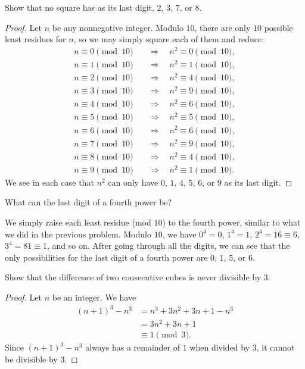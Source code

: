  Show that no square has as its last digit, $2$, $3$, $7$,
or $8$.
\begin{proof}
  Let $n$ be any nonnegative integer. Modulo $10$, there are only $10$
  possible least residues for $n$, so we may simply square each of
  them and reduce:
  \begin{align*}
    n\equiv0\pmod{10}\quad&\Rightarrow\quad n^2\equiv0\pmod{10}, \\
    n\equiv1\pmod{10}\quad&\Rightarrow\quad n^2\equiv1\pmod{10}, \\
    n\equiv2\pmod{10}\quad&\Rightarrow\quad n^2\equiv4\pmod{10}, \\
    n\equiv3\pmod{10}\quad&\Rightarrow\quad n^2\equiv9\pmod{10}, \\
    n\equiv4\pmod{10}\quad&\Rightarrow\quad n^2\equiv6\pmod{10}, \\
    n\equiv5\pmod{10}\quad&\Rightarrow\quad n^2\equiv5\pmod{10}, \\
    n\equiv6\pmod{10}\quad&\Rightarrow\quad n^2\equiv6\pmod{10}, \\
    n\equiv7\pmod{10}\quad&\Rightarrow\quad n^2\equiv9\pmod{10}, \\
    n\equiv8\pmod{10}\quad&\Rightarrow\quad n^2\equiv4\pmod{10}, \\
    n\equiv9\pmod{10}\quad&\Rightarrow\quad n^2\equiv1\pmod{10}.
  \end{align*}
  We see in each case that $n^2$ can only have $0$, $1$, $4$, $5$,
  $6$, or $9$ as its last digit.
\end{proof}

 What can the last digit of a fourth power be?
\begin{solution}
  We simply raise each least residue (mod $10$) to the fourth power,
  similar to what we did in the previous problem. Modulo $10$, we have
  $0^4 = 0$, $1^4 = 1$, $2^4 = 16\equiv6$, $3^4 = 81\equiv1$, and so
  on. After going through all the digits, we can see that the only
  possibilities for the last digit of a fourth power are $0$, $1$,
  $5$, or $6$.
\end{solution}

 Show that the difference of two consecutive cubes is
never divisible by $3$.
\begin{proof}
  Let $n$ be an integer. We have
  \begin{align*}
    (n+1)^3 - n^3
    &= n^3 + 3n^2 + 3n + 1 - n^3 \\
    &= 3n^2 + 3n + 1 \\
    &\equiv1\pmod3.
  \end{align*}
  Since $(n+1)^3 - n^3$ always has a remainder of $1$ when divided by
  $3$, it cannot be divisible by $3$.
\end{proof}

